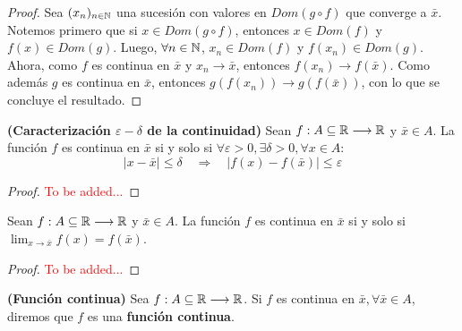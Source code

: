 \begin{proof}
	Sea $(x_n)_{n\in\mathbb{N}}$ una sucesión con valores en $Dom(g \circ f)$ que converge a $\bar{x}$. Notemos primero que si $x \in Dom(g \circ f)$, entonces $x \in Dom(f)$ y $f(x) \in Dom(g)$. Luego, $\forall n \in \mathbb{N}$, $x_n \in Dom(f)$ y $f(x_n) \in Dom(g)$. Ahora, como $f$ es continua en $\bar{x}$ y $x_n\rightarrow \bar{x}$, entonces $f(x_n) \rightarrow f(\bar{x})$. Como además $g$ es continua en $\bar{x}$, entonces $g(f(x_n)) \rightarrow g(f(\bar{x}))$, con lo que se concluye el resultado. 
\end{proof}

\begin{proposicion}
	\textbf{(Caracterización $\varepsilon-\delta$ de la continuidad)}
	Sean $f: A \subseteq \mathbb{R} \longrightarrow \mathbb{R}$ y $\bar{x} \in A$. La función $f$ es continua en $\bar{x}$ si y solo si $\forall \varepsilon > 0, \exists \delta > 0, \forall x \in A$: 
	$$ | x - \bar{x} | \leq \delta \quad \Longrightarrow \quad |f(x) - f(\bar{x}) | \leq \varepsilon $$ 
\end{proposicion}

\begin{proof}
	\textcolor{red}{To be added...}
\end{proof}

\begin{proposicion}
	Sean $f: A \subseteq \mathbb{R} \longrightarrow \mathbb{R}$ y $\bar{x} \in A$. La función $f$ es continua en $\bar{x}$ si y solo si $\lim_{x\rightarrow\bar{x}} f(x) = f(\bar{x})$. 
\end{proposicion}

\begin{proof}
	\textcolor{red}{To be added...}
\end{proof}

\begin{definicion}
	\textbf{(Función continua)} Sea $f: A \subseteq \mathbb{R} \longrightarrow \mathbb{R}$. Si $f$ es continua en $\bar{x}, \forall \bar{x} \in A$, diremos que $f$ es una \textbf{función continua}. 
\end{definicion}